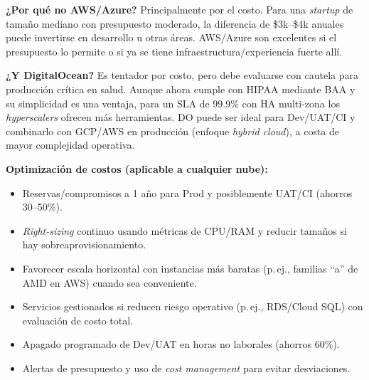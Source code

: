 \documentclass[12pt]{article}
\begin{document}
\noindent
\textbf{¿Por qué no AWS/Azure?} Principalmente por el costo. Para una \emph{startup} de tamaño mediano con presupuesto moderado, la diferencia de \$3k--\$4k anuales puede invertirse en desarrollo u otras áreas. AWS/Azure son excelentes si el presupuesto lo permite o si ya se tiene infraestructura/experiencia fuerte allí. 

\noindent
\textbf{¿Y DigitalOcean?} Es tentador por costo, pero debe evaluarse con cautela para producción crítica en salud. Aunque ahora cumple con HIPAA mediante BAA y su simplicidad es una ventaja, para un SLA de 99.9\% con HA multi-zona los \emph{hyperscalers} ofrecen más herramientas. DO puede ser ideal para Dev/UAT/CI y combinarlo con GCP/AWS en producción (enfoque \emph{hybrid cloud}), a costa de mayor complejidad operativa.

\noindent
\textbf{Optimización de costos (aplicable a cualquier nube):}
\begin{itemize}
  \item Reservas/compromisos a 1 año para Prod y posiblemente UAT/CI (ahorros 30--50\%).
  \item \emph{Right-sizing} continuo usando métricas de CPU/RAM y reducir tamaños si hay sobreaprovisionamiento.
  \item Favorecer escala horizontal con instancias más baratas (p.\,ej., familias \enquote{a} de AMD en AWS) cuando sea conveniente.
  \item Servicios gestionados si reducen riesgo operativo (p.\,ej., RDS/Cloud SQL) con evaluación de costo total.
  \item Apagado programado de Dev/UAT en horas no laborales (ahorros 60\%).
  \item Alertas de presupuesto y uso de \emph{cost management} para evitar desviaciones.
\end{itemize}
\end{document}
